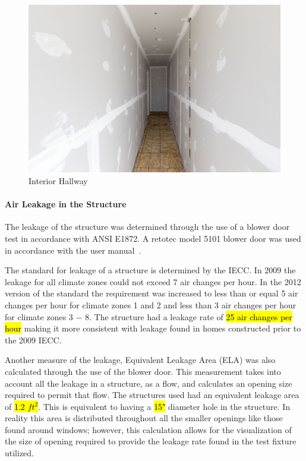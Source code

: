 \documentclass[12pt,oneside]{book}
\begin{document}
\begin{figure}[H]
\centering
\includegraphics[width=\textwidth]{Figures/Structures/inthallway.png}
\caption{Interior Hallway}
\label{fig:inthallway}
\end{figure}

\paragraph{Air Leakage in the Structure}

The leakage of the structure was determined through the use of a blower door test in accordance with ANSI E1872. A retotec model 5101 blower door was used in accordance with the user manual~\cite{RetroTecManual}.

The standard for leakage of a structure is determined by the IECC. In 2009 the leakage for all climate zones could not exceed 7 air changes per hour. In the 2012 version of the standard the requirement was increased to less than or equal 5 air changes per hour for climate zones 1 and 2 and less than 3 air changes per hour for climate zones 3 $-$ 8.  The structure had a leakage rate of \hl{25 air changes per hour} making it more consistent with leakage found in homes constructed prior to the 2009 IECC. 

Another measure of the leakage, Equivalent Leakage Area (ELA) was also calculated through the use of the blower door. This measurement takes into account all the leakage in a structure, as a flow, and calculates an opening size required to permit that flow. The structures used had an equivalent leakage area of \hl{1.2 $ft^2$}. This is equivalent to having a \hl{15"} diameter hole in the structure. In reality this area is distributed throughout all the smaller openings like those found around windows; however, this calculation allows for the visualization of the size of opening required to provide the leakage rate found in the test fixture utilized. 
\end{document}
